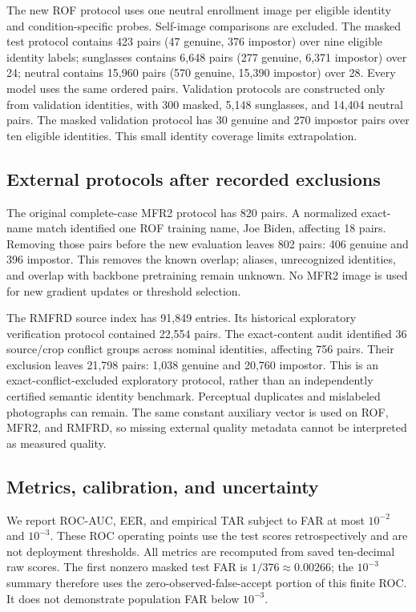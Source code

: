 \documentclass[10pt,journal,compsoc]{IEEEtran}
\begin{document}
The new ROF protocol uses one neutral enrollment image per eligible identity and condition-specific probes. Self-image comparisons are excluded. The masked test protocol contains 423 pairs (47 genuine, 376 impostor) over nine eligible identity labels; sunglasses contains 6,648 pairs (277 genuine, 6,371 impostor) over 24; neutral contains 15,960 pairs (570 genuine, 15,390 impostor) over 28. Every model uses the same ordered pairs. Validation protocols are constructed only from validation identities, with 300 masked, 5,148 sunglasses, and 14,404 neutral pairs. The masked validation protocol has 30 genuine and 270 impostor pairs over ten eligible identities. This small identity coverage limits extrapolation.

\subsection{External protocols after recorded exclusions}
The original complete-case MFR2 protocol has 820 pairs. A normalized exact-name match identified one ROF training name, Joe Biden, affecting 18 pairs. Removing those pairs before the new evaluation leaves 802 pairs: 406 genuine and 396 impostor. This removes the known overlap; aliases, unrecognized identities, and overlap with backbone pretraining remain unknown. No MFR2 image is used for new gradient updates or threshold selection.

The RMFRD source index has 91,849 entries. Its historical exploratory verification protocol contained 22,554 pairs. The exact-content audit identified 36 source/crop conflict groups across nominal identities, affecting 756 pairs. Their exclusion leaves 21,798 pairs: 1,038 genuine and 20,760 impostor. This is an exact-conflict-excluded exploratory protocol, rather than an independently certified semantic identity benchmark. Perceptual duplicates and mislabeled photographs can remain. The same constant auxiliary vector is used on ROF, MFR2, and RMFRD, so missing external quality metadata cannot be interpreted as measured quality.

\subsection{Metrics, calibration, and uncertainty}
We report ROC-AUC, EER, and empirical TAR subject to FAR at most $10^{-2}$ and $10^{-3}$. These ROC operating points use the test scores retrospectively and are not deployment thresholds. All metrics are recomputed from saved ten-decimal raw scores. The first nonzero masked test FAR is $1/376\approx0.00266$; the $10^{-3}$ summary therefore uses the zero-observed-false-accept portion of this finite ROC. It does not demonstrate population FAR below $10^{-3}$.
\end{document}
